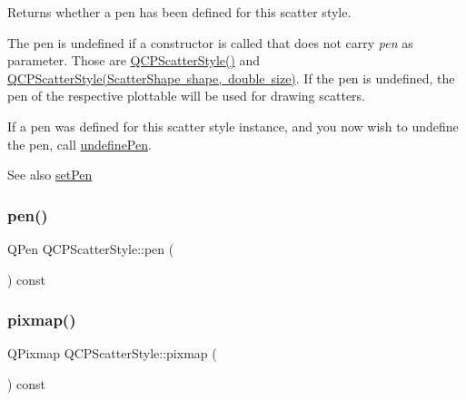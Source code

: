 Returns whether a pen has been defined for this scatter style.

The pen is undefined if a constructor is called that does not carry {\itshape pen} as parameter. Those are \mbox{\hyperlink{class_q_c_p_scatter_style_a8836018d9ad83ccd8870de8315c1be73}{Q\+C\+P\+Scatter\+Style()}} and \mbox{\hyperlink{class_q_c_p_scatter_style_a003d92f74f4561eda111862eadd62f28}{Q\+C\+P\+Scatter\+Style(\+Scatter\+Shape shape, double size)}}. If the pen is undefined, the pen of the respective plottable will be used for drawing scatters.

If a pen was defined for this scatter style instance, and you now wish to undefine the pen, call \mbox{\hyperlink{class_q_c_p_scatter_style_acabc2a8c83d650b946f50c3166b6c35e}{undefine\+Pen}}.

\begin{DoxySeeAlso}{See also}
\mbox{\hyperlink{class_q_c_p_scatter_style_a761f1f229cc0ca4703e1e2b89f6dd1ba}{set\+Pen}} 
\end{DoxySeeAlso}
\mbox{\label{class_q_c_p_scatter_style_acdd6313d16e69d3810e9d1f48dd9e4bb}} 
\subsubsection{\texorpdfstring{pen()}{pen()}}
{\footnotesize\ttfamily Q\+Pen Q\+C\+P\+Scatter\+Style\+::pen (\begin{DoxyParamCaption}{ }\end{DoxyParamCaption}) const\hspace{0.3cm}{\ttfamily [inline]}}

\mbox{\label{class_q_c_p_scatter_style_a9b2d1a2ec0aac0c74f7582d14050e93a}} 
\subsubsection{\texorpdfstring{pixmap()}{pixmap()}}
{\footnotesize\ttfamily Q\+Pixmap Q\+C\+P\+Scatter\+Style\+::pixmap (\begin{DoxyParamCaption}{ }\end{DoxyParamCaption}) const\hspace{0.3cm}{\ttfamily [inline]}}

